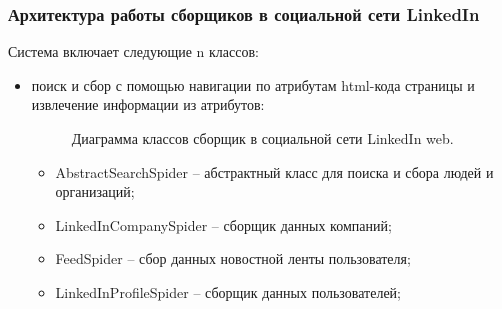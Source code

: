 \subsubsection{Архитектура работы сборщиков в социальной сети LinkedIn}


Система включает следующие n классов:
\begin{itemize}
    \item поиск и сбор с помощью навигации по атрибутам html-кода страницы и извлечение информации из атрибутов:
    \begin{figure}[H]
        \caption{Диаграмма классов сборщик в социальной сети LinkedIn web.}
        \label{ris:image}
    \end{figure}
    \begin{itemize}
        \item AbstractSearchSpider -- абстрактный класс для поиска и сбора людей и организаций;
        \item LinkedInCompanySpider -- сборщик данных компаний;
        \item FeedSpider -- сбор данных новостной ленты пользователя; 
        \item LinkedInProfileSpider -- сборщик данных пользователей;

\end{itemize}
\end{itemize}
